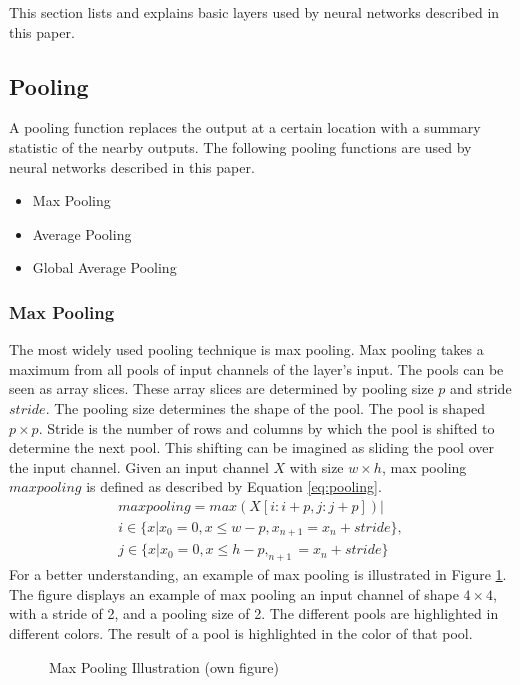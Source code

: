 This section lists and explains basic layers used by neural networks described in this paper.
\subsection{Pooling}
A pooling function replaces the output at a certain location with a
summary statistic of the nearby outputs. \autocite{Goodfellow.2016} The following pooling functions are used by neural networks described in this paper.
\begin{itemize}
	\item Max Pooling
	\item Average Pooling
	\item Global Average Pooling
\end{itemize}
\subsubsection{Max Pooling}
The most widely used pooling technique is max pooling. Max pooling takes a maximum from all pools of input channels of the layer's input.\autocite{Singh.2020} The pools can be seen as array slices. These array slices are determined by pooling size $p$ and stride $stride$. The pooling size determines the shape of the pool. The pool is shaped $p \times p$. Stride is the number of rows and columns by which the pool is shifted to determine the next pool. This shifting can be imagined as sliding the pool over the input channel. Given an input channel $X$ with size $w \times h$, max pooling $maxpooling$ is defined as described by Equation \eqref{eq:pooling}. \autocite{Michelucci.2019}
\begin{equation}
	\label{eq:pooling}
	\begin{array}{l}
	maxpooling = max(X[i:i+p, j:j+p]) |\\
	i \in \{x|x_0=0, x \le w-p, x_{n+1} = x_n+stride\},\\
	j \in \{x|x_0=0, x \le h-p, _{n+1} = x_n+stride\}
	\end{array}
\end{equation}
For a better understanding, an example of max pooling is illustrated in Figure \ref{fig:pooling}. The figure displays an example of max pooling an input channel of shape $4 \times 4$, with a stride of 2, and a pooling size of 2. The different pools are highlighted in different colors. The result of a pool is highlighted in the color of that pool.
\begin{figure}[H]
	\centering
	
	\caption{Max Pooling Illustration (own figure)}
	\label{fig:pooling}
\end{figure}
